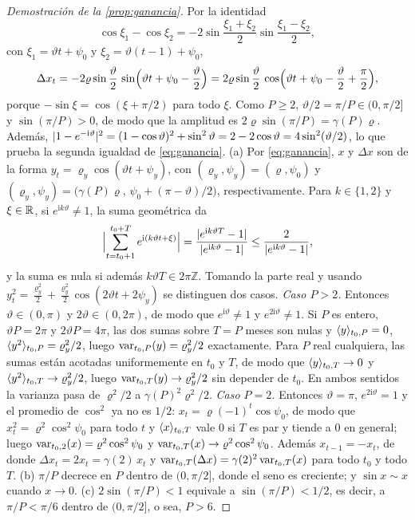 \begin{proof}[Demostración de la \cref{prop:ganancia}]
Por la identidad
\[
  \cos\xi_1-\cos\xi_2=-2\sin\frac{\xi_1+\xi_2}{2}\sin\frac{\xi_1-\xi_2}{2},
\]
con $\xi_1=\vartheta t+\psi_0$ y $\xi_2=\vartheta(t-1)+\psi_0$,
\[
  \Delta x_t=-2\varrho\sin\frac{\vartheta}{2}\,\sin\Bigl(\vartheta t+\psi_0-\frac{\vartheta}{2}\Bigr)
  =2\varrho\sin\frac{\vartheta}{2}\,\cos\Bigl(\vartheta t+\psi_0-\frac{\vartheta}{2}+\frac{\pi}{2}\Bigr),
\]
porque $-\sin\xi=\cos(\xi+\pi/2)$ para todo $\xi$. Como $P\ge2$, $\vartheta/2=\pi/P\in(0,\pi/2]$ y
$\sin(\pi/P)>0$, de modo que la amplitud es $2\varrho\sin(\pi/P)=\gamma(P)\varrho$. Además,
$\lvert 1-e^{-\mathrm{i}\vartheta}\rvert^2=(1-\cos\vartheta)^2+\sin^2\vartheta=2-2\cos\vartheta
=4\sin^2(\vartheta/2)$, lo que prueba la segunda igualdad de \cref{eq:ganancia}.
\textup{(a)} Por \cref{eq:ganancia}, $x$ y $\Delta x$ son de la forma
$y_t=\varrho_y\cos(\vartheta t+\psi_y)$, con $(\varrho_y,\psi_y)=(\varrho,\psi_0)$ y
$(\varrho_y,\psi_y)=\bigl(\gamma(P)\varrho,\,\psi_0+(\pi-\vartheta)/2\bigr)$, respectivamente.
Para $k\in\{1, 2\}$ y $\xi\in\mathbb{R}$, si $e^{\mathrm{i}k\vartheta}\ne1$, la suma geométrica da
\[
  \Bigl\lvert\sum_{t=t_0+1}^{t_0+T}e^{\mathrm{i}(k\vartheta t+\xi)}\Bigr\rvert
  =\frac{\lvert e^{\mathrm{i}k\vartheta T}-1\rvert}{\lvert e^{\mathrm{i}k\vartheta}-1\rvert}
  \le\frac{2}{\lvert e^{\mathrm{i}k\vartheta}-1\rvert},
\]
y la suma es nula si además $k\vartheta T\in2\pi\mathbb{Z}$. Tomando la parte real y usando
$y_t^2=\frac{\varrho_y^2}{2}+\frac{\varrho_y^2}{2}\cos(2\vartheta t+2\psi_y)$ se distinguen dos
casos. \emph{Caso $P>2$.} Entonces $\vartheta\in(0,\pi)$ y $2\vartheta\in(0,2\pi)$, de modo que
$e^{\mathrm{i}\vartheta}\ne1$ y $e^{2\mathrm{i}\vartheta}\ne1$. Si $P$ es entero, $\vartheta P=2\pi$ y
$2\vartheta P=4\pi$, las dos sumas sobre $T=P$ meses son nulas y
$\langle y\rangle_{t_0,P}=0$, $\langle y^2\rangle_{t_0,P}=\varrho_y^2/2$, luego
$\operatorname{var}_{t_0,P}(y)=\varrho_y^2/2$ exactamente. Para $P$ real cualquiera, las sumas están acotadas
uniformemente en $t_0$ y $T$, de modo que $\langle y\rangle_{t_0,T}\to0$ y
$\langle y^2\rangle_{t_0,T}\to\varrho_y^2/2$, luego $\operatorname{var}_{t_0,T}(y)\to\varrho_y^2/2$ sin depender de
$t_0$. En ambos sentidos la varianza pasa de $\varrho^2/2$ a $\gamma(P)^2\varrho^2/2$.
\emph{Caso $P=2$.} Entonces $\vartheta=\pi$, $e^{2\mathrm{i}\vartheta}=1$ y el promedio de
$\cos^2$ ya no es $1/2$: $x_t=\varrho(-1)^t\cos\psi_0$, de modo que $x_t^2=\varrho^2\cos^2\psi_0$
para todo $t$ y $\langle x\rangle_{t_0,T}$ vale $0$ si $T$ es par y tiende a $0$ en general; luego
$\operatorname{var}_{t_0,2}(x)=\varrho^2\cos^2\psi_0$ y $\operatorname{var}_{t_0,T}(x)\to\varrho^2\cos^2\psi_0$. Además
$x_{t-1}=-x_t$, de donde $\Delta x_t=2x_t=\gamma(2)\,x_t$ y
$\operatorname{var}_{t_0,T}(\Delta x)=\gamma(2)^2\operatorname{var}_{t_0,T}(x)$ para todo $t_0$ y todo $T$.
\textup{(b)} $\pi/P$ decrece en $P$ dentro de
$(0,\pi/2]$, donde el seno es creciente; y $\sin x\sim x$ cuando $x\to0$. \textup{(c)}
$2\sin(\pi/P)<1$ equivale a $\sin(\pi/P)<1/2$, es decir, a $\pi/P<\pi/6$ dentro de
$(0,\pi/2]$, o sea, $P>6$.
\end{proof}

